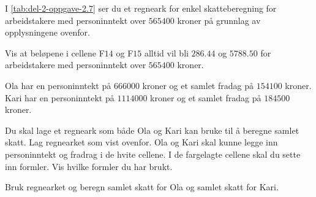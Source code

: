 I \cref{tab:del-2-oppgave-2.7} ser du et regneark for enkel skatteberegning for
arbeidstakere med personinntekt over $\num{565400}$ kroner på grunnlag av
opplysningene ovenfor.

\begin{oppgaver}
   Vis at beløpene i cellene F$14$ og F$15$ alltid vil bli
    $\num{286.44}$ og $\num{5788.50}$ for arbeidstakere med personinntekt over
    $\num{565400}$ kroner.
\end{oppgaver}

Ola har en personinntekt på $\num{666000}$ kroner og et samlet fradag på
$\num{154100}$ kroner. Kari har en personinntekt på $\num{1114000}$ kroner og
et samlet fradag på $\num{184500}$ kroner.

\begin{oppgaver}
   Du skal lage et regneark som både Ola og Kari kan bruke til å
    beregne samlet skatt. Lag regnearket som vist ovenfor. Ola og Kari skal
    kunne legge inn personinntekt og fradrag i de hvite cellene. I de fargelagte
    cellene skal du sette inn formler. Vis hvilke formler du har brukt.
\end{oppgaver}

\begin{oppgaver}
   Bruk regnearket og beregn samlet skatt for Ola og samlet skatt for
    Kari.
\end{oppgaver}


\Oppgave[7]

\begin{figure}[H]
  \centering
  \begin{subfigure}[b]{0.25\textwidth}
    \centering
    \caption{}
    \label{fig:del-1-oppgave-8-a}
  \end{subfigure}\hfill%
  \begin{subfigure}[b]{0.32\textwidth}
    \centering
    \vspace*{-0.5cm}
    \caption{}
    \label{fig:del-1-oppgave-8-b}
  \end{subfigure}\hfill%
  \begin{subfigure}[b]{0.41\textwidth}
    \centering
    \caption{}
    \label{fig:del-1-oppgave-8-c}
  \end{subfigure}
  \caption{}\label{fig:del-1-oppgave-8}
\end{figure}

